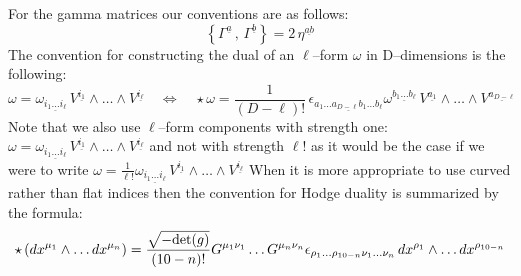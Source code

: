 \documentclass[a4paper,11pt]{article}
\begin{document}
For the gamma matrices our conventions are as follows:
\begin{equation}
  \left\{ \Gamma^{\underline{a}} \, , \, \Gamma^{\underline{b}} \right\}  = 2\,  \eta^{\underline{ab}}
\end{equation}
The convention for
constructing the dual of an $\ell$--form $\omega$ in D--dimensions is
the following:
\begin{equation}
  \omega= \omega_{\underline{i_1\dots i_\ell}} \, V^{\underline{i_1}} \wedge \dots \wedge
  V^{\underline{i_\ell}} \quad \Leftrightarrow \quad \star \omega = \frac{1}{(D-\ell)!} \,
  \epsilon_{\underline{a_1 \dots a_{D-\ell} b_1
  \dots b_\ell}} \omega^{\underline{b_1\dots
  b_\ell}} \, V^{\underline{a_1}} \wedge \dots \wedge V^{\underline{a_{D-\ell}}}
\label{hodgedual}
\end{equation}
Note that we also use $\ell$--form components with strength one:
$\omega= \omega_{\underline{i_1\dots i_\ell}} \, V^{\underline{i_1}} \wedge \dots \wedge
  V^{\underline{i_\ell}}$ and not with strength $\ell!$ as it would
  be the case if we were to write $\omega= \frac {1}{\ell !}\omega_{\underline{i_1\dots i_\ell}} \,
  V^{\underline{i_1}} \wedge \dots \wedge V^{\underline{i_\ell}}$
When it is more appropriate to use curved rather than flat indices
then the convention for Hodge duality is summarized by the formula:
\begin{equation}
  \star\left(dx^{\mu_1}\wedge\dots dx^{\mu_n}\right)=\frac{\sqrt{-{\rm det}(g)}}{(10-n)!}G^{\mu_1\nu_1}\dots
G^{\mu_n\nu_n}\epsilon_{\rho_1\dots
 \rho_{10-n}\nu_1\dots \nu_n}\,dx^{\rho_1}\wedge\dots dx^{\rho_{10-n}}
\label{hodgecurvo}
\end{equation}
\end{document}
